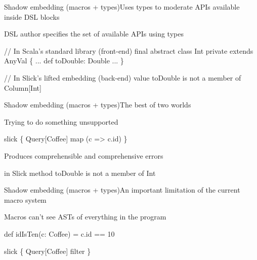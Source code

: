 \documentclass{beamer}
\begin{document}
\begin{frame}[fragile]{Shadow embedding (macros + types)}{Uses types to moderate APIs available inside DSL blocks}
  \vspace{1em}
  \begin{exampleblock}{DSL author specifies the set of available APIs using types}
  \begin{semiverbatim}
// In Scala's standard library (front-end)
final abstract class Int private extends AnyVal \{
  ...
  def toDouble: Double
  ...
\}

// In Slick's lifted embedding (back-end)
value toDouble is not a member of Column[Int]
  \end{semiverbatim}
  \end{exampleblock}
\end{frame}

\begin{frame}[fragile]{Shadow embedding (macros + types)}{The best of two worlds}
  \vspace{1em}
  \begin{exampleblock}{Trying to do something unsupported}
  \begin{semiverbatim}
slick \{
  Query[Coffee] map
    (c => c.id\text{\color{blue}{.toDouble}})
\}\end{semiverbatim}
  \end{exampleblock}

  \vspace{1em}
  \begin{exampleblock}{Produces comprehensible and comprehensive errors}
  \begin{semiverbatim}
in Slick method toDouble is not a member of Int
  \end{semiverbatim}
  \end{exampleblock}
\end{frame}

\begin{frame}[fragile]{Shadow embedding (macros + types)}{An important limitation of the current macro system}
  \vspace{1em}
  \begin{alertblock}{Macros can't see ASTs of everything in the program}
  \begin{semiverbatim}
def idIsTen(c: Coffee) = c.id == 10

slick \{
  Query[Coffee] filter \text{\color{blue}{idIsTen}}
\}
  \end{semiverbatim}
  \end{alertblock}
\end{frame}
\end{document}
